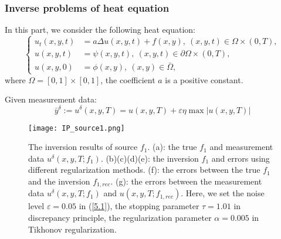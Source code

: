 \documentclass[mathserif,envcountsect,compress,8pt]{beamer}
\begin{document}
\subsubsection{Inverse problems of heat equation}
\begin{frame}
	\setlength{\parskip}{0.6\baselineskip}
	In this part, we consider the following heat equation:
	\begin{equation*}\label{5.0}
		\left\{\begin{aligned}
			u_t(x,y,t) & = a\Delta u(x,y,t) + f(x,y),~(x,y,t)\in\Omega\times (0,T), \\
			u(x,y,t)   & = \psi(x,y,t),~(x,y,t)\in\partial\Omega\times (0,T),       \\
			u(x,y,0)   & = \phi(x,y),~(x,y)\in\bar{\Omega},
		\end{aligned}\right.
	\end{equation*}
	where $\Omega = [0,1]\times [0,1]$, the coefficient $a$ is a positive constant.
	
	Given measurement data:
	\begin{equation*}\label{5.1}
		\bar{y}^{\delta}:=u^{\delta}(x,y,T)=u(x,y,T)+\varepsilon \eta\max|u(x,y,T)|
	\end{equation*}
\end{frame}


\begin{frame}
	\setlength{\parskip}{0.6\baselineskip}
	\begin{figure}[H]
		\centering
		\begin{minipage}[t]{0.8\linewidth}
			\centering
			\texttt{[image: IP\_source1.png]}
		\end{minipage}
		\centering
		\label{fig_1}
		\caption{The inversion results of source $f_1$. (a): the true $f_1$ and measurement data $u^{\delta}(x,y,T;f_1)$. (b)(c)(d)(e): the inversion $f_1$ and errors using different regularization methods. (f): the errors between the true $f_1$ and the inversion $f_{1,rec}$. (g): the errors between the measurement data $u^{\delta}(x,y,T;f_1)$ and $u(x,y,T;f_{1,rec})$. Here, we set the noise level $\varepsilon=0.05$ in (\ref{5.1}), the stopping parameter $\tau=1.01$ in discrepancy principle, the regularization parameter $\alpha=0.005$ in Tikhonov regularization.}
		\label{f1_figure}
	\end{figure}
\end{frame}
\end{document}
